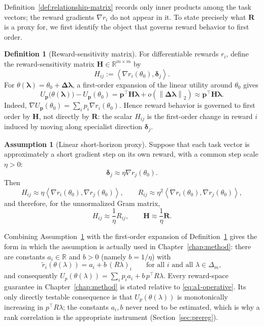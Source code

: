 \documentclass[12pt,a4paper]{report}
\newcommand{\R}{\mathbb{R}}
\newcommand{\1}{\mathbf{1}}
\newcommand{\norm}[1]{\left\lVert #1 \right\rVert}
\theoremstyle{definition}
\newtheorem{definition}{Definition}
\newtheorem{assumption}{Assumption}
\begin{document}
Definition~\ref{def:relationship-matrix} records only inner products among the task vectors; the reward gradients \(\nabla r_i\) do not appear in it. To state precisely what \(\mathbf R\) is a proxy for, we first identify the object that governs reward behavior to first order.

\begin{definition}[Reward-sensitivity matrix]
\label{def:reward-sensitivity}
For differentiable rewards \(r_i\), define the reward-sensitivity matrix \(\mathbf H\in\R^{m\times m}\) by
\[
H_{ij}:=\left\langle\nabla r_i(\theta_0),\boldsymbol{\delta}_j\right\rangle.
\]
For \(\theta(\boldsymbol{\lambda})=\theta_0+\boldsymbol{\Delta}\boldsymbol{\lambda}\), a first-order expansion of the linear utility around \(\theta_0\) gives
\[
U_{\mathbf p}\bigl(\theta(\boldsymbol{\lambda})\bigr)-U_{\mathbf p}(\theta_0)
=\mathbf p^{\top}\mathbf H\boldsymbol{\lambda}+o\!\left(\norm{\boldsymbol{\Delta}\boldsymbol{\lambda}}_2\right)
\approx\mathbf p^{\top}\mathbf H\boldsymbol{\lambda}.
\]
Indeed, \(\nabla U_{\mathbf p}(\theta_0)=\sum_i p_i\nabla r_i(\theta_0)\). Hence reward behavior is governed to first order by \(\mathbf H\), not directly by \(\mathbf R\): the scalar \(H_{ij}\) is the first-order change in reward \(i\) induced by moving along specialist direction \(\boldsymbol{\delta}_j\).
\end{definition}

\begin{assumption}[Linear short-horizon proxy]
\label{ass:linear-short-horizon-proxy}
Suppose that each task vector is approximately a short gradient step on its own reward, with a common step scale \(\eta>0\):
\[
\boldsymbol{\delta}_j\approx\eta\nabla r_j(\theta_0).
\]
Then
\[
H_{ij}\approx\eta\left\langle\nabla r_i(\theta_0),\nabla r_j(\theta_0)\right\rangle,
\qquad
R_{ij}\approx\eta^2\left\langle\nabla r_i(\theta_0),\nabla r_j(\theta_0)\right\rangle,
\]
and therefore, for the unnormalized Gram matrix,
\[
H_{ij}\approx\frac{1}{\eta}R_{ij},
\qquad
\mathbf H\approx\frac{1}{\eta}\mathbf R.
\]
\end{assumption}

Combining Assumption~\ref{ass:linear-short-horizon-proxy} with the first-order expansion of Definition~\ref{def:reward-sensitivity} gives the form in which the assumption is actually used in Chapter~\ref{chap:method}: there are constants \(a_i\in\R\) and \(b>0\) (namely \(b=1/\eta\)) with
\begin{equation}
\label{eq:a1-operative}
\tilde r_i(\theta(\lambda))=a_i+b\,(R\lambda)_i
\qquad\text{for all } i \text{ and all }\lambda\in\Delta_m,
\end{equation}
and consequently \(U_p(\theta(\lambda))=\sum_i p_i a_i + b\,p^\top R\lambda\). Every reward-space guarantee in Chapter~\ref{chap:method} is stated relative to \eqref{eq:a1-operative}. Its only directly testable consequence is that \(U_p(\theta(\lambda))\) is monotonically increasing in \(p^\top R\lambda\); the constants \(a_i,b\) never need to be estimated, which is why a rank correlation is the appropriate instrument (Section~\ref{sec:prereg}).
\end{document}
